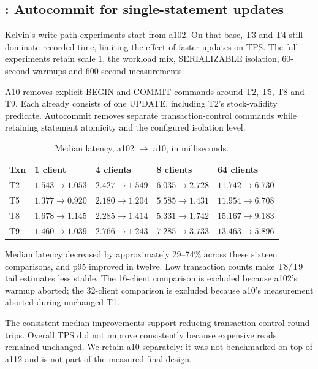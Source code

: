 \subsection{: Autocommit for single-statement updates}
\label{sec:a10}
Kelvin's write-path experiments start from a102. On that base, T3 and T4
still dominate recorded time, limiting the effect of faster updates on TPS.
The full experiments retain scale 1, the workload mix, SERIALIZABLE isolation,
60-second warmups and 600-second measurements.

A10 removes explicit BEGIN and COMMIT commands around T2, T5, T8 and T9.
Each already consists of one UPDATE, including T2's stock-validity predicate.
Autocommit removes separate transaction-control commands while retaining
statement atomicity and the configured isolation level.

\begin{table}[htbp]
\caption{Median latency, a102 $\rightarrow$ a10, in milliseconds.}
\label{tab:a10}
\begin{tabularx}{\linewidth}{@{}lZZZZ@{}}
\toprule
\textbf{Txn} & \textbf{1 client} & \textbf{4 clients} &
\textbf{8 clients} & \textbf{64 clients} \\
\midrule
T2 & $1.543 \to 1.053$ & $2.427 \to 1.549$ & $6.035 \to 2.728$ & $11.742 \to 6.730$ \\
T5 & $1.377 \to 0.920$ & $2.180 \to 1.204$ & $5.585 \to 1.431$ & $11.954 \to 6.708$ \\
T8 & $1.678 \to 1.145$ & $2.285 \to 1.414$ & $5.331 \to 1.742$ & $15.167 \to 9.183$ \\
T9 & $1.460 \to 1.039$ & $2.766 \to 1.243$ & $7.285 \to 3.733$ & $13.463 \to 5.896$ \\
\bottomrule
\end{tabularx}
\end{table}

Median latency decreased by approximately 29--74\% across these sixteen
comparisons, and p95 improved in twelve. Low transaction counts make T8/T9 tail
estimates less stable. The 16-client comparison is excluded because a102's
warmup aborted; the 32-client comparison is excluded because a10's measurement
aborted during unchanged T1.

The consistent median improvements support reducing transaction-control round
trips. Overall TPS did not improve consistently because expensive reads remained
unchanged. We retain a10 separately: it was not benchmarked on top of a112
and is not part of the measured final design.
